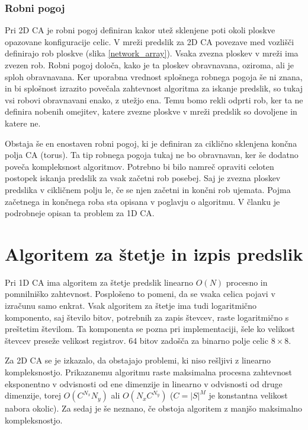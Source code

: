 \documentclass[12pt,a4paper,openany,twoside]{book}
\begin{document}
\subsection{Robni pogoj}

Pri 2D CA je robni pogoj definiran kakor utež sklenjene poti okoli ploskve opazovane konfiguracije celic.
V mreži predslik za 2D CA povezave med vozlišči definirajo rob ploskve (slika \ref{network_array}).
Vsaka zvezna ploskev v mreži ima zvezen rob. Robni pogoj določa, kako je ta ploskev obravnavana,
oziroma, ali je sploh obravnavana.
Ker uporabna vrednost splošnega robnega pogoja še ni znana,
in bi splošnost izrazito povečala zahtevnost algoritma za iskanje predslik,
so tukaj vsi robovi obravnavani enako, z utežjo ena. Temu bomo rekli odprti rob,
ker ta ne definira nobenih omejitev, katere zvezne ploskve v mreži predslik
so dovoljene in katere ne.

Obstaja še en enostaven robni pogoj, ki je definiran za ciklično sklenjena končna polja CA (torus).
Ta tip robnega pogoja tukaj ne bo obravnavan, ker še dodatno poveča kompleksnost algoritmov.
Potrebno bi bilo namreč opraviti celoten postopek iskanja predslik za vsak začetni rob posebej.
Saj je zvezna ploskev predslika v cikličnem polju le, če se njen začetni in končni rob ujemata.
Pojma začetnega in končnega roba sta opisana v poglavju o algoritmu.
V članku \cite{JerasDobnikar2007} je podrobneje opisan ta problem za 1D CA.




\chapter{Algoritem za štetje in izpis predslik}
\label{algoritem}

Pri 1D CA \cite{JerasDobnikar2007} ima algoritem za štetje predslik
linearno \(O(N)\) procesno in pomnilniško zahtevnost.
Posplošeno to pomeni, da se vsaka celica pojavi v izračunu samo enkrat.
Vsak algoritem za štetje ima tudi logaritmično komponento,
saj število bitov, potrebnih za zapis števcev, raste logaritmično s preštetim številom.
Ta komponenta se pozna pri implementaciji,
šele ko velikost števcev preseže velikost registrov.
64 bitov zadošča za binarno polje celic \(8 \times 8\).

Za 2D CA se je izkazalo, da obstajajo problemi, ki niso rešljivi z linearno kompleksnostjo.
Prikazanemu algoritmu raste maksimalna procesna zahtevnost
eksponentno v odvisnosti od ene dimenzije in
linearno v odvisnosti od druge dimenzije,
torej \(O(C^{N_x} N_y)\) ali \(O(N_x C^{N_y})\) (\(C=|S|^M\) je konstantna velikost nabora okolic).
Za sedaj je še neznano, če obstoja algoritem z manjšo maksimalno kompleksnostjo.
\end{document}

